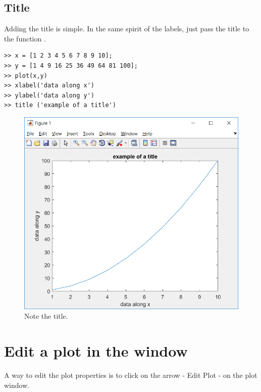 	\subsection{Title}
		Adding the title is simple.
		In the same spirit of the labels, just pass the title to the function .
\begin{lstlisting}
>> x = [1 2 3 4 5 6 7 8 9 10];
>> y = [1 4 9 16 25 36 49 64 81 100];
>> plot(x,y)
>> xlabel('data along x')
>> ylabel('data along y')
>> title ('example of a title')
\end{lstlisting}
		\begin{figure}
			\center
			\includegraphics[height=0.43\linewidth]{./fig/plot_title.PNG}
			\caption{
				Note the title.
				}
			\label{fig-title}
		\end{figure}	
\section{Edit a plot in the window}
	A way to edit the plot properties is to click on the arrow - Edit Plot - on the plot window.

